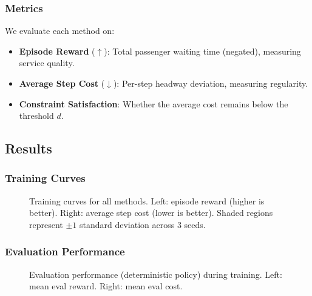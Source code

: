 \documentclass[10pt]{article}
\begin{document}
\subsubsection{Metrics}

We evaluate each method on:
\begin{itemize}
    \item \textbf{Episode Reward} ($\uparrow$): Total passenger waiting time (negated), measuring service quality.
    \item \textbf{Average Step Cost} ($\downarrow$): Per-step headway deviation, measuring regularity.
    \item \textbf{Constraint Satisfaction}: Whether the average cost remains below the threshold $d$.
\end{itemize}

\subsection{Results}


\subsubsection{Training Curves}

\begin{figure}[h]
    \centering
    \caption{Training curves for all methods. Left: episode reward (higher is better). Right: average step cost (lower is better). Shaded regions represent $\pm 1$ standard deviation across 3 seeds.}
    \label{fig:training_curves}
\end{figure}

\subsubsection{Evaluation Performance}

\begin{figure}[h]
    \centering
    \caption{Evaluation performance (deterministic policy) during training. Left: mean eval reward. Right: mean eval cost.}
    \label{fig:eval_curves}
\end{figure}
\end{document}

